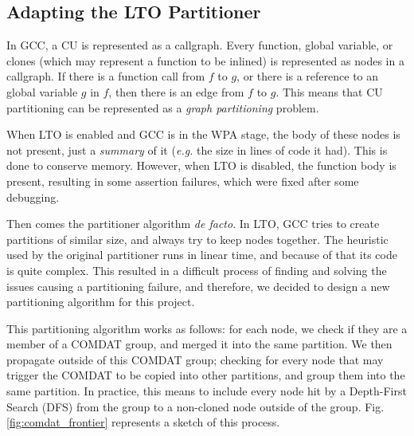 \documentclass[runningheads]{llncs}
\begin{document}
\subsection{Adapting the LTO Partitioner}\label{sec:lto_partitioner}

In GCC, a CU is represented as a callgraph. Every function, global variable, or
clones (which may represent a function to be inlined) is represented as nodes
in a callgraph. If there is a function call from $f$ to $g$, or there is a
reference to an global variable $g$ in $f$, then there is an edge from $f$ to
$g$. This means that CU partitioning can be represented as a \emph{graph
partitioning} problem. 

When LTO is enabled and GCC is in the WPA stage, the body of these nodes
is not present, just a \textit{summary} of it (\textit{e.g.} the size
in lines of code it had). This is done to conserve memory. However,
when LTO is disabled, the function body is present, resulting
in some assertion failures, which were fixed after some debugging.

Then comes the partitioner algorithm \textit{de facto}. In LTO, GCC tries to
create partitions of similar size, and always try to keep nodes together. The
heuristic used by the original partitioner runs in linear time, and because of
that its code is quite complex. This resulted in a difficult process of finding
and solving the issues causing a partitioning failure, and therefore, we
decided to design a new partitioning algorithm for this project.

This partitioning algorithm works as follows: for each node, we check if they
are a member of a COMDAT \cite{comdat} group, and
merged it into the same partition. We then propagate outside of this COMDAT group;
checking for every node that may trigger the COMDAT to be copied into other
partitions, and group them into the same partition. In practice,
this means to include every node hit by a Depth-First
Search (DFS) from the group to a non-cloned node outside of the group.
Fig. \ref{fig:comdat_frontier} represents a sketch of this process.
\end{document}
